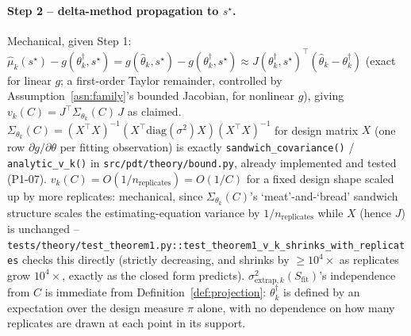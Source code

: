 \paragraph{Step 2 -- delta-method propagation to $s^\star$.}
\label{sec:theorem1-step2}
Mechanical, given Step 1: $\hat\mu_k(s^\star) - g(\theta_k^\dagger, s^\star)
= g(\hat\theta_k, s^\star) - g(\theta_k^\dagger, s^\star) \approx
J(\theta_k^\dagger, s^\star)^\top (\hat\theta_k - \theta_k^\dagger)$ (exact for linear
$g$; a first-order Taylor remainder, controlled by Assumption~\ref{asn:family}'s bounded
Jacobian, for nonlinear $g$), giving $v_k(C) = J^\top \Sigma_{\theta_k}(C) \, J$ as
claimed. $\Sigma_{\theta_k}(C) = (X^\top X)^{-1}(X^\top \mathrm{diag}(\sigma^2) X)(X^\top
X)^{-1}$ for design matrix $X$ (one row $\partial g/\partial\theta$ per fitting
observation) is exactly \texttt{sandwich\_covariance()} /
\texttt{analytic\_v\_k()} in \texttt{src/pdt/theory/bound.py}, already implemented and
tested (P1-07). $v_k(C) = O(1/n_{\mathrm{replicates}}) = O(1/C)$ for a fixed design
shape scaled up by more replicates: mechanical, since $\Sigma_{\theta_k}(C)$'s
`meat'-and-`bread' sandwich structure scales the estimating-equation variance by
$1/n_{\mathrm{replicates}}$ while $X$ (hence $J$) is unchanged --
\texttt{tests/theory/test\_theorem1.py::test\_theorem1\_v\_k\_shrinks\_with\_replicates}
checks this directly (strictly decreasing, and shrinks by $\ge 10^4\times$ as
replicates grow $10^4\times$, exactly as the closed form predicts).
$\sigma^2_{\mathrm{extrap}, k}(S_{\mathrm{fit}})$'s independence from $C$ is immediate
from Definition~\ref{def:projection}: $\theta_k^\dagger$ is defined by an expectation
over the design measure $\pi$ alone, with no dependence on how many replicates are
drawn at each point in its support.

